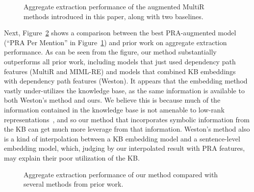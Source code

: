 \documentclass[11pt,a4paper]{article}
\newcommand{\figref}[1]{Figure~\ref{fig:#1}}
\begin{document}
\begin{figure}
  \centering
  \caption{Aggregate extraction performance of the augmented MultiR methods
  introduced in this paper, along with two baselines.}
  \label{fig:our-comparison}
\end{figure}

Next, \figref{prior-work-comparison} shows a comparison between the best
PRA-augmented model (``PRA Per Mention'' in \figref{our-comparison}) and prior
work on aggregate extraction performance.  As can be seen from the figure, our
method substantially outperforms all prior work, including models that just
used dependency path features (MultiR and MIML-RE) and models that combined KB
embeddings with dependency path features (Weston).  It appears that the
embedding method vastly under-utilizes the knowledge base, as the same
information is available to both Weston's method and ours.  We believe this is
because much of the information contained in the knowledge base is not amenable
to low-rank representations~\cite{nickel-2014-are}, and so our method that
incorporates symbolic information from the KB can get much more leverage from
that information.  Weston's method also is a kind of interpolation between a KB
embedding model and a sentence-level embedding model, which, judging by our
interpolated result with PRA features, may explain their poor utilization of
the KB.

\begin{figure}
  \centering
  \caption{Aggregate extraction performance of our method compared with several
  methods from prior work.}
  \label{fig:prior-work-comparison}
\end{figure}
\end{document}
